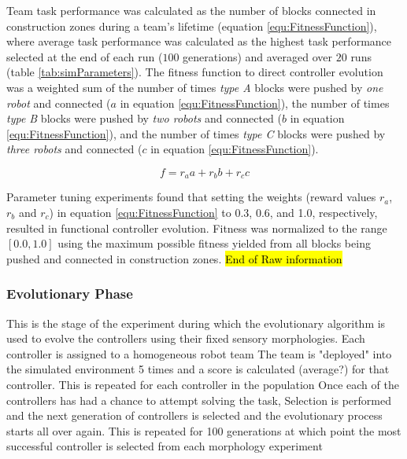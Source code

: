 \documentclass[conference]{IEEEtran}
\DeclareRobustCommand{\hlcyan}[1]{{\sethlcolor{cyan}\hl{#1}}}
\begin{document}
Team task performance was calculated as the number of blocks connected in construction zones
during a team's lifetime (equation \ref{equ:FitnessFunction}),
where average task performance was calculated as the highest task
performance selected at the end of each run ($100$ generations) and averaged over $20$ runs
(table \ref{tab:simParameters}).
The fitness function to direct controller evolution was a weighted sum of
the number of times \textit{type A} blocks were pushed by \textit{one robot}
and connected (\(a\) in equation \ref{equ:FitnessFunction}), the number of times \textit{type B} blocks were pushed
by \textit{two robots} and connected (\(b\) in equation \ref{equ:FitnessFunction}),
and the number of times \textit{type C} blocks were pushed by \textit{three robots}
and connected (\(c\) in equation \ref{equ:FitnessFunction}).

\begin{equation}\label{equ:FitnessFunction}
f = r_a a + r_b b + r_c c
\end{equation}

Parameter tuning experiments found that setting the weights (reward values \(r_a\), \(r_b\) and \(r_c\))
in equation \ref{equ:FitnessFunction} to 0.3, 0.6, and 1.0, respectively, resulted in functional controller evolution.
Fitness was normalized to the range \([0.0, 1.0]\) using the maximum possible fitness yielded from
all blocks being pushed and connected in construction zones.
\hl{End of Raw information}

\subsubsection{Evolutionary Phase}
This is the stage of the experiment during which the evolutionary algorithm is used to evolve the controllers using their fixed sensory morphologies. 
Each controller is assigned to a homogeneous robot team 
The team is "deployed" into the simulated environment 5 times and a score is calculated (average?) for that controller.
This is repeated for each controller in the population 
Once each of the controllers has had a chance to attempt solving the task, Selection is performed and the next generation of controllers is selected and the evolutionary process starts all over again.
This is repeated for 100 generations at which point the most successful controller is selected from each morphology experiment
\end{document}
